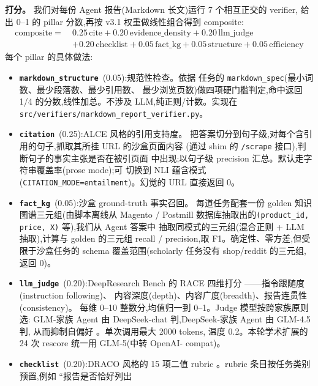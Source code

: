 \documentclass[UTF8,11pt]{ctexart}
\begin{document}
\textbf{打分。}
我们对每份 Agent 报告(Markdown 长文)运行 7 个相互正交的 verifier,
给出 0--1 的 pillar 分数,再按 v3.1 权重做线性组合得到 composite:
\begin{align*}
  \mathrm{composite} =\ & 0.25\,\text{cite} + 0.20\,\text{evidence\_density}
    + 0.20\,\text{llm\_judge} \\
    & + 0.20\,\text{checklist} + 0.05\,\text{fact\_kg}
    + 0.05\,\text{structure} + 0.05\,\text{efficiency}
\end{align*}
每个 pillar 的具体做法:

\begin{itemize}[leftmargin=1.5em,itemsep=0.15em,topsep=0.2em]
  \item \textbf{\texttt{markdown\_structure}}\ (0.05):规范性检查。依据
    任务的 \texttt{markdown\_spec}(最小词数、最少段落数、最少引用数、
    最少浏览页数)做四项硬门槛判定,命中返回 1/4 的分数,线性加总。不涉及
    LLM,纯正则/计数。实现在 \texttt{src/verifiers/markdown\_report\_verifier.py}。
  \item \textbf{\texttt{citation}}\ (0.25):ALCE 风格的引用支持度。
    把答案切分到句子级,对每个含引用的句子,抓取其所挂 URL 的沙盒页面内容
    (通过 shim 的 \texttt{/scrape} 接口),判断句子的事实主张是否在被引页面
    中出现;以句子级 precision 汇总。默认走字符串覆盖率(prose mode);可
    切换到 NLI 蕴含模式(\texttt{CITATION\_MODE=entailment})。幻觉的 URL
    直接返回 0。
  \item \textbf{\texttt{fact\_kg}}\ (0.05):沙盒 ground-truth 事实召回。
    每道任务配套一份 golden 知识图谱三元组(由脚本离线从 Magento / Postmill
    数据库抽取出的\texttt{(product\_id, price, X)} 等),我们从 Agent 答案中
    抽取同模式的三元组(混合正则 + LLM 抽取),计算与 golden 的三元组
    recall / precision,取 F1。确定性、零方差,但受限于沙盒任务的 schema
    覆盖范围(scholarly 任务没有 shop/reddit 的三元组,返回 0)。
  \item \textbf{\texttt{llm\_judge}}\ (0.20):DeepResearch Bench 的 RACE
    四维打分 \citep{dr-bench-2026}——指令跟随度(instruction following)、
    内容深度(depth)、内容广度(breadth)、报告连贯性(consistency)。
    每维 0--10 整数分,均值归一到 0--1。Judge 模型按跨家族原则选:
    GLM-家族 Agent 由 DeepSeek-chat 判,DeepSeek-家族 Agent 由 GLM-4.5 判,
    从而抑制自偏好 \citep{wataoka-2024}。单次调用最大 2000 tokens,
    温度 0.2。本轮学术扩展的 24 次 rescore 统一用 GLM-5(中转 OpenAI-
    compat)。
  \item \textbf{\texttt{checklist}}\ (0.20):DRACO 风格的 15 项二值 rubric
    \citep{draco-2026}。rubric 条目按任务类别预置,例如 “报告是否恰好列出

\end{itemize}
\end{document}
